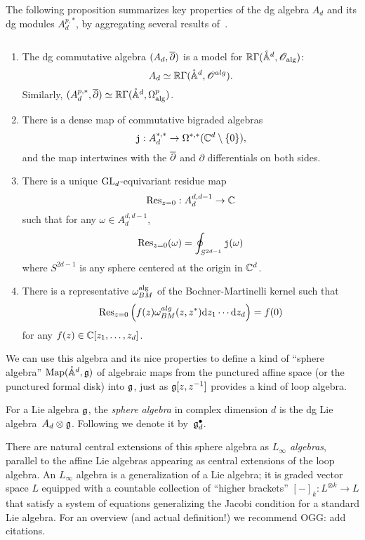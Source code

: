 \documentclass[11pt]{amsart}
\def\pAA{\mathring{\AA}}
\def\jou{{\mathtt{j}}}
\def\owen#1{{\textcolor{green!65!black}{OGG: {#1}}}}
\begin{document}
The following proposition summarizes key properties of the dg algebra $A_d$ and its dg modules $A_{d}^{p,*}$,
by aggregating several results of~\cite{FHK}.

\begin{prop}
\label{prop: Ad} $\;$
\begin{enumerate}
\item
The dg commutative algebra $(A_d,{\overline{\partial}})$ is a model for $\RR \Gamma(\pAA^d, \sO_{\rm alg})$:
\[
A_d \simeq \RR\Gamma(\pAA^{d}, \sO^{alg}) .
\]
Similarly, $(A_d^{p,*},\dbar) \simeq \RR \Gamma(\pAA^{d}, \Omega^{p}_{\rm alg})$.
\item There is a dense map of commutative bigraded algebras
\[
\jou : A^{*,*}_d \to \Omega^{*,*}(\CC^d \setminus \{0\}),
\]
and the map intertwines with the ${\overline{\partial}}$ and $\partial$ differentials on both sides.
\item There is a unique ${\rm GL}_d$-equivariant residue map
\[
{\rm Res}_{z=0} : A_d^{d,d-1} \to \mathbb C
\]
such that for any $\omega \in A^{d,d-1}_d$,
\[
{\rm Res}_{z=0} (\omega) = \oint_{S^{2d-1}} \jou(\omega)
\]
where $S^{2d-1}$ is any sphere centered at the origin in $\mathbb C^d$. 
\item There is a representative $\omega_{BM}^{\rm alg}$ of the Bochner-Martinelli kernel such that
\[
{\rm Res}_{z=0} \left(f(z) \omega_{BM}^{alg}(z,z^*) {\rm d} z_1 \cdots {\rm d} z_d\right) = f(0)
\]
for any $f (z) \in \mathbb C[z_1,\ldots,z_d]$. 
\end{enumerate}
\end{prop}

We can use this algebra and its nice properties to define a kind of ``sphere algebra'' $\Map(\pAA^d,\fg)$ of algebraic maps from the punctured affine space (or the punctured formal disk) into $\mathfrak g$,
just as $\mathfrak g[z,z^{-1}]$ provides a kind of loop algebra.

\begin{dfn}
For a Lie algebra $\mathfrak g$, the {\em sphere algebra} in complex dimension $d$ is the dg Lie algebra~$A_d \otimes \mathfrak g$.
Following \cite{FHK} we denote it by~$\mathfrak g^\bullet_d$.
\end{dfn}

There are natural central extensions of this sphere algebra as {\em $L_\infty$ algebras},
parallel to the affine Lie algebras appearing as central extensions of the loop algebra.
An $L_\infty$ algebra is a generalization of a Lie algebra;
it is graded vector space $L$ equipped with a countable collection of ``higher brackets'' $[-]_k: L^{\otimes k} \to L$ that satisfy a system of equations generalizing the Jacobi condition for a standard Lie algebra.
For an overview (and actual definition!) we recommend \owen{add citations}.
\end{document}
